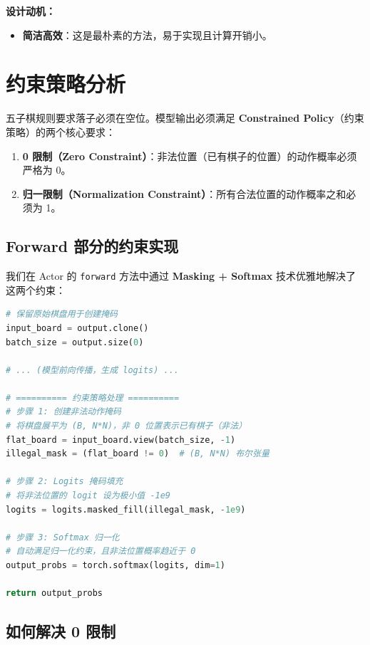 \documentclass[oneside]{ctexbook}
\begin{document}
\textbf{设计动机：}
\begin{itemize}
    \item \textbf{简洁高效}：这是最朴素的方法，易于实现且计算开销小。
\end{itemize}

\chapter{约束策略分析} \label{chap:constrained_policy_analysis}

五子棋规则要求落子必须在空位。模型输出必须满足 \textbf{Constrained Policy}（约束策略）的两个核心要求：
\begin{enumerate}
    \item \textbf{0 限制（Zero Constraint）}：非法位置（已有棋子的位置）的动作概率必须严格为 0。
    \item \textbf{归一限制（Normalization Constraint）}：所有合法位置的动作概率之和必须为 1。
\end{enumerate}

\section{Forward 部分的约束实现}

我们在 Actor 的 \texttt{forward} 方法中通过 \textbf{Masking + Softmax} 技术优雅地解决了这两个约束：

\begin{lstlisting}[language=Python]
# 保留原始棋盘用于创建掩码
input_board = output.clone()
batch_size = output.size(0)

# ... (模型前向传播，生成 logits) ...

# ========== 约束策略处理 ==========
# 步骤 1: 创建非法动作掩码
# 将棋盘展平为 (B, N*N)，非 0 位置表示已有棋子（非法）
flat_board = input_board.view(batch_size, -1)
illegal_mask = (flat_board != 0)  # (B, N*N) 布尔张量

# 步骤 2: Logits 掩码填充
# 将非法位置的 logit 设为极小值 -1e9
logits = logits.masked_fill(illegal_mask, -1e9)

# 步骤 3: Softmax 归一化
# 自动满足归一化约束，且非法位置概率趋近于 0
output_probs = torch.softmax(logits, dim=1)

return output_probs
\end{lstlisting}

\section{如何解决 0 限制}
\end{document}
